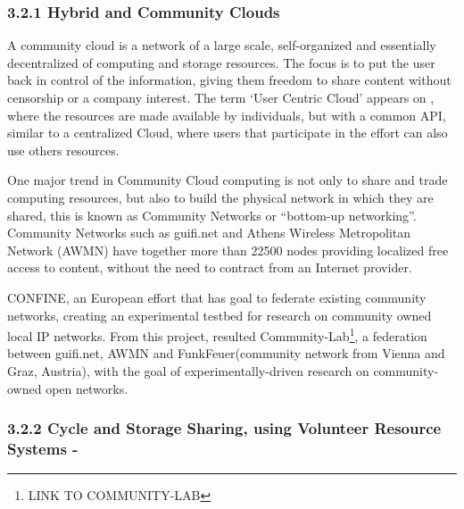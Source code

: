 




\subsubsection{3.2.1 Hybrid and Community Clouds}

A community cloud is a network of a large scale, self-organized and essentially decentralized of computing and storage resources. The focus is to put the user back in control of the information, giving them freedom to share content without censorship or a company interest. The term `User Centric Cloud' appears on \cite{Barraca2011}, where the resources are made available by individuals, but with a common API, similar to a centralized Cloud, where users that participate in the effort can also use others resources.

One major trend in Community Cloud computing is not only to share and trade computing resources, but also to build the physical network in which they are shared, this is known as Community Networks or ``bottom-up networking''. Community Networks such as guifi.net and Athens Wireless Metropolitan Network (AWMN) have together more than 22500 nodes providing localized free access to content, without the need to contract from an Internet provider.

CONFINE\cite{Navarro}, an European effort that has goal to federate existing community networks, creating an experimental testbed for research on community owned local IP networks. From this project, resulted Community-Lab\footnote{LINK TO COMMUNITY-LAB}, a federation between guifi.net, AWMN and FunkFeuer(community network from Vienna and Graz, Austria), with the goal of experimentally-driven research on community-owned open networks.



\subsubsection{3.2.2 Cycle and Storage Sharing, using Volunteer Resource Systems -}

